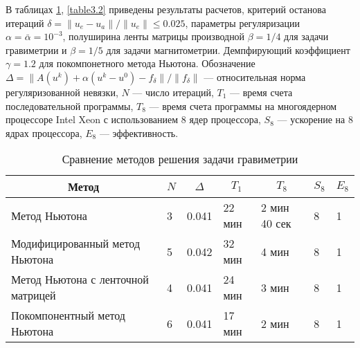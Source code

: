 В таблицах \ref{table3.1}, \ref{table3.2} приведены результаты расчетов, критерий останова итераций 
$\delta=\|u_e-u_a\|/\|u_e\|\le 0.025$, параметры регуляризации $\alpha=\bar{\alpha}=10^{-3}$, полуширина ленты матрицы производной $\beta=1/4$ для задачи гравиметрии и $\beta=1/5$ для задачи магнитометрии. Демпфирующий коэффициент $\gamma=1.2$ для покомпонетного метода Ньютона. Обозначение $\Delta=\|A(u^k)+\alpha(u^k-u^0)-f_\delta\|/\|f_\delta\|$ --- относительная норма регуляризованной невязки, $N$ --- число итераций, $T_1$ --- время счета последовательной программы, $T_8$ --- время счета программы на многоядерном процессоре Intel Xeon с использованием 8 ядер процессора, $S_8$ --- ускорение на 8 ядрах процессора, $E_8$ --- эффективность.
\begin{table}[]
	\centering
	\renewcommand{\arraystretch}{1.5}
	\caption{Сравнение методов решения задачи гравиметрии}
	\label{table3.1}
	\begin{tabular}{|p{}|p{}|l|l|l|l|l|}
		\hline
		\multicolumn{1}{|c|}{Метод}        & \multicolumn{1}{c|}{$N$} &
		\multicolumn{1}{c|}{$\Delta$} & \multicolumn{1}{c|}{$T_1$} & \multicolumn{1}{c|}{$T_8$} &
		\multicolumn{1}{c|}{$S_8$} & \multicolumn{1}{c|}{$E_8$}
		 \\ \hline
		Метод Ньютона                      &  3        & 0.041                          &       22 мин                  &     2 мин 40 сек &
		8 & 1 \\ \hline
		Модифицированный метод Ньютона     &         5           & 0.042            & 32 мин                  & 4 мин      &
		8 & 1             \\ \hline
		Метод Ньютона с ленточной матрицей &  4               & 0.041                    & 24 мин                  & 3 мин       & 8 & 1            \\ \hline
		Покомпонентный метод Ньютона &  6               & 0.041                    & 17 мин                  & 2 мин       & 8 & 1            \\ \hline
	\end{tabular}
\end{table}
